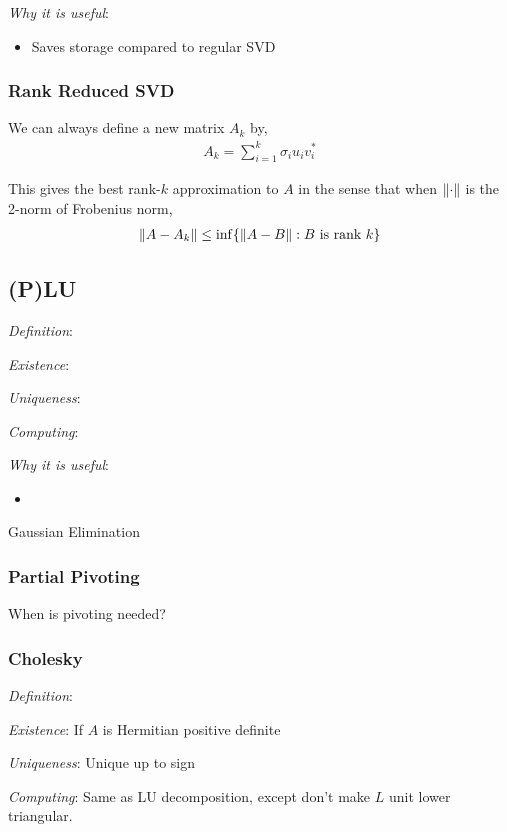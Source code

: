 \documentclass[12pt]{article}
\begin{document}
\textit{Why it is useful}:
\begin{itemize}[nolistsep]
    \item Saves storage compared to regular SVD
\end{itemize}

\subsubsection{Rank Reduced SVD}
We can always define a new matrix \( A_k \) by,
\begin{align*}
    A_k = \sum_{i=1}^{k} \sigma_i u_iv_i^*
\end{align*}

This gives the best rank-\( k \) approximation to \( A \) in the sense that when \( \left\lVert\cdot\right\rVert \) is the 2-norm of Frobenius norm,
\begin{align*}
    \left\lVert A-A_k\right\rVert \leq \operatorname{inf} \{ \left\lVert A-B\right\rVert : B\text{ is rank } k \}
\end{align*}



\subsection{(P)LU}
\textit{Definition}:

\textit{Existence}:

\textit{Uniqueness}:

\textit{Computing}:

\textit{Why it is useful}:
\begin{itemize}[nolistsep]
    \item 
\end{itemize}

Gaussian Elimination 

\subsubsection{Partial Pivoting}

When is pivoting needed?

\subsubsection{Cholesky}
\label{sec:cholesky}
\textit{Definition}:

\textit{Existence}: If \( A \) is Hermitian positive definite

\textit{Uniqueness}: Unique up to sign

\textit{Computing}: Same as LU decomposition, except don't make \( L \) unit lower triangular.
\end{document}
